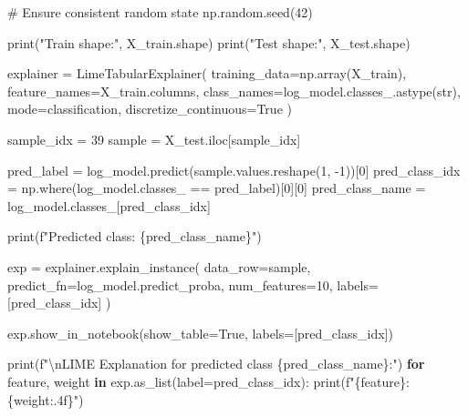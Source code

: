 \documentclass[
  letterpaper,
  DIV=11,
  numbers=noendperiod]{scrartcl}
\newenvironment{Shaded}{\begin{snugshade}}{\end{snugshade}}
\newcommand{\BuiltInTok}[1]{\textcolor[rgb]{0.00,0.23,0.31}{#1}}
\newcommand{\CharTok}[1]{\textcolor[rgb]{0.13,0.47,0.30}{#1}}
\newcommand{\CommentTok}[1]{\textcolor[rgb]{0.37,0.37,0.37}{#1}}
\newcommand{\ControlFlowTok}[1]{\textcolor[rgb]{0.00,0.23,0.31}{\textbf{#1}}}
\newcommand{\DecValTok}[1]{\textcolor[rgb]{0.68,0.00,0.00}{#1}}
\newcommand{\KeywordTok}[1]{\textcolor[rgb]{0.00,0.23,0.31}{\textbf{#1}}}
\newcommand{\NormalTok}[1]{\textcolor[rgb]{0.00,0.23,0.31}{#1}}
\newcommand{\OperatorTok}[1]{\textcolor[rgb]{0.37,0.37,0.37}{#1}}
\newcommand{\SpecialCharTok}[1]{\textcolor[rgb]{0.37,0.37,0.37}{#1}}
\newcommand{\SpecialStringTok}[1]{\textcolor[rgb]{0.13,0.47,0.30}{#1}}
\newcommand{\StringTok}[1]{\textcolor[rgb]{0.13,0.47,0.30}{#1}}
\newcommand{\VariableTok}[1]{\textcolor[rgb]{0.07,0.07,0.07}{#1}}
\begin{document}
\begin{Shaded}
\begin{Highlighting}[]
\CommentTok{\# Ensure consistent random state}
\NormalTok{np.random.seed(}\DecValTok{42}\NormalTok{)}

\BuiltInTok{print}\NormalTok{(}\StringTok{"Train shape:"}\NormalTok{, X\_train.shape)}
\BuiltInTok{print}\NormalTok{(}\StringTok{"Test shape:"}\NormalTok{, X\_test.shape)}

\NormalTok{explainer }\OperatorTok{=}\NormalTok{ LimeTabularExplainer(}
\NormalTok{    training\_data}\OperatorTok{=}\NormalTok{np.array(X\_train),}
\NormalTok{    feature\_names}\OperatorTok{=}\NormalTok{X\_train.columns,}
\NormalTok{    class\_names}\OperatorTok{=}\NormalTok{log\_model.classes\_.astype(}\BuiltInTok{str}\NormalTok{),}
\NormalTok{    mode}\OperatorTok{=}\StringTok{\textquotesingle{}classification\textquotesingle{}}\NormalTok{,}
\NormalTok{    discretize\_continuous}\OperatorTok{=}\VariableTok{True}
\NormalTok{)}

\NormalTok{sample\_idx }\OperatorTok{=} \DecValTok{39}
\NormalTok{sample }\OperatorTok{=}\NormalTok{ X\_test.iloc[sample\_idx]}


\NormalTok{pred\_label }\OperatorTok{=}\NormalTok{ log\_model.predict(sample.values.reshape(}\DecValTok{1}\NormalTok{, }\OperatorTok{{-}}\DecValTok{1}\NormalTok{))[}\DecValTok{0}\NormalTok{]      }
\NormalTok{pred\_class\_idx }\OperatorTok{=}\NormalTok{ np.where(log\_model.classes\_ }\OperatorTok{==}\NormalTok{ pred\_label)[}\DecValTok{0}\NormalTok{][}\DecValTok{0}\NormalTok{]    }
\NormalTok{pred\_class\_name }\OperatorTok{=}\NormalTok{ log\_model.classes\_[pred\_class\_idx]}

\BuiltInTok{print}\NormalTok{(}\SpecialStringTok{f"Predicted class: }\SpecialCharTok{\{}\NormalTok{pred\_class\_name}\SpecialCharTok{\}}\SpecialStringTok{"}\NormalTok{)}


\NormalTok{exp }\OperatorTok{=}\NormalTok{ explainer.explain\_instance(}
\NormalTok{    data\_row}\OperatorTok{=}\NormalTok{sample,}
\NormalTok{    predict\_fn}\OperatorTok{=}\NormalTok{log\_model.predict\_proba, }
\NormalTok{    num\_features}\OperatorTok{=}\DecValTok{10}\NormalTok{,}
\NormalTok{    labels}\OperatorTok{=}\NormalTok{[pred\_class\_idx]   }
\NormalTok{)}

\NormalTok{exp.show\_in\_notebook(show\_table}\OperatorTok{=}\VariableTok{True}\NormalTok{, labels}\OperatorTok{=}\NormalTok{[pred\_class\_idx])}

\BuiltInTok{print}\NormalTok{(}\SpecialStringTok{f"}\CharTok{\textbackslash{}n}\SpecialStringTok{LIME Explanation for predicted class \textquotesingle{}}\SpecialCharTok{\{}\NormalTok{pred\_class\_name}\SpecialCharTok{\}}\SpecialStringTok{\textquotesingle{}:"}\NormalTok{)}
\ControlFlowTok{for}\NormalTok{ feature, weight }\KeywordTok{in}\NormalTok{ exp.as\_list(label}\OperatorTok{=}\NormalTok{pred\_class\_idx):}
    \BuiltInTok{print}\NormalTok{(}\SpecialStringTok{f"}\SpecialCharTok{\{}\NormalTok{feature}\SpecialCharTok{\}}\SpecialStringTok{: }\SpecialCharTok{\{}\NormalTok{weight}\SpecialCharTok{:.4f\}}\SpecialStringTok{"}\NormalTok{)}
\end{Highlighting}
\end{Shaded}
\end{document}
